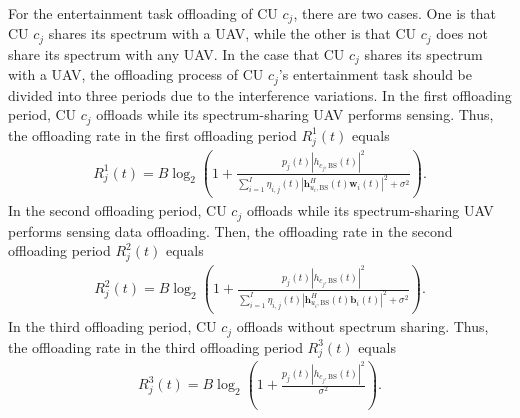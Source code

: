 \documentclass[10pt,journal,compsoc]{IEEEtran}
\begin{document}
For the entertainment task offloading of CU 
$c_{j}$, there are two cases. One is that CU $c_{j}$ shares its spectrum with a UAV, while the other is that CU $c_{j}$ does not share its spectrum with any UAV.
In the case that CU $c_{j}$ shares its spectrum with a UAV, 
the offloading process of CU $c_{j}$'s entertainment task should be divided into three periods due to the interference variations. 
In the first offloading period,  CU $c_{j}$ offloads while its spectrum-sharing UAV performs sensing. Thus, the offloading rate in the first offloading period $R_{j}^{1}(t)$ equals
    \begin{equation}
    \begin{array}{l}
    R_{j}^{1}(t) = B \log_2 \left( 1 + \frac{p_{j}(t) \left|h_{c_{j}, \text{BS}}(t)\right|^{2}}{\sum \limits_{i = 1}^{I} \eta_{i, j}(t) \left|\bm{h}^{H}_{u_{i}, \text{BS}}(t)  \bm{w}_{i}(t)\right|^{2} + \sigma^{2}} \right).
    \end{array}
    \end{equation}    
In the second offloading period, CU $c_{j}$ offloads while its spectrum-sharing UAV performs sensing data offloading. Then, the offloading rate in the second offloading period $R_{j}^{2}(t)$ equals
    \begin{equation}
    \begin{array}{l}
    R_{j}^{2}(t) = B \log_2 \left( 1 + \frac{p_{j}(t) \left|h_{c_{j}, \text{BS}}(t)\right|^{2}}{\sum \limits_{i = 1}^{I} \eta_{i, j}(t) \left|\bm{h}^{H}_{u_{i}, \text{BS}}(t) \bm{b}_{i}(t)\right|^{2} + \sigma^{2}} \right).
    \end{array}
    \end{equation} 
In the third offloading period, CU $c_{j}$ offloads without spectrum sharing. Thus, the offloading rate in the third offloading period $R_{j}^{3}(t)$ equals
    \begin{equation}\label{CU-No-Interference}
    \begin{array}{l}
    R_{j}^{3}(t) = B \log_2 \left( 1 + \frac{p_{j}(t) \left|h_{c_{j}, \text{BS}}(t)\right|^{2}}{\sigma^{2}} \right).
    \end{array}
    \end{equation}
\end{document}
